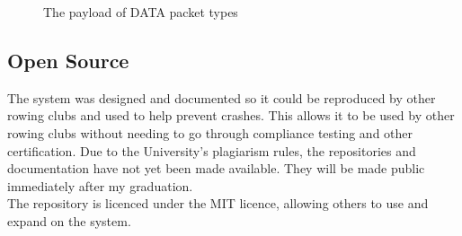 \documentclass[12pt,a4paper]{report}
\begin{document}
\begin{figure}[h]
\begin{center}
\end{center}
\caption{The payload of DATA packet types}
\end{figure}
\FloatBarrier

\subsection{Open Source}
The system was designed and documented so it could be reproduced by other rowing clubs and used to help prevent crashes. This allows it to be used by other rowing clubs without needing to go through compliance testing and other certification. Due to the University's plagiarism rules, the repositories and documentation have not yet been made available. They will be made public immediately after my graduation. \\
The repository is licenced under the MIT licence, allowing others to use and expand on the system. \\ \\
\bigskip
\end{document}
